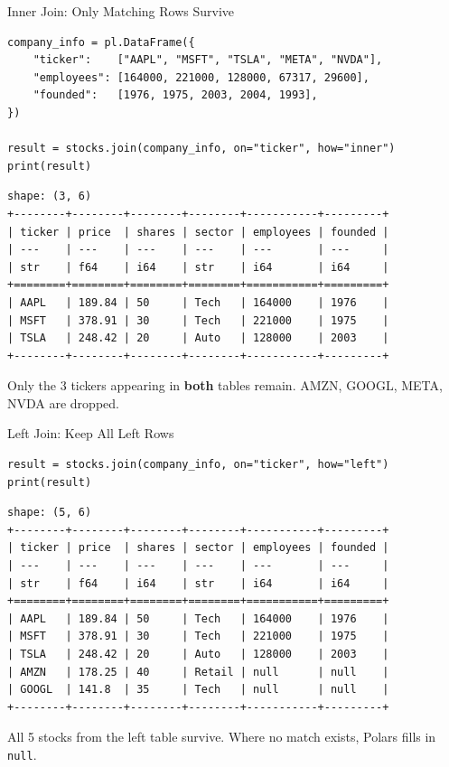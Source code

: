 \documentclass[9pt,aspectratio=169]{beamer}
\newcommand{\py}[1]{\lstinline[language=Python]{#1}}
\begin{document}
\begin{frame}[fragile]{Inner Join: Only Matching Rows Survive}

\begin{lstlisting}
company_info = pl.DataFrame({
    "ticker":    ["AAPL", "MSFT", "TSLA", "META", "NVDA"],
    "employees": [164000, 221000, 128000, 67317, 29600],
    "founded":   [1976, 1975, 2003, 2004, 1993],
})

result = stocks.join(company_info, on="ticker", how="inner")
print(result)
\end{lstlisting}

\begin{lstlisting}[style=output]
shape: (3, 6)
+--------+--------+--------+--------+-----------+---------+
| ticker | price  | shares | sector | employees | founded |
| ---    | ---    | ---    | ---    | ---       | ---     |
| str    | f64    | i64    | str    | i64       | i64     |
+========+========+========+========+===========+=========+
| AAPL   | 189.84 | 50     | Tech   | 164000    | 1976    |
| MSFT   | 378.91 | 30     | Tech   | 221000    | 1975    |
| TSLA   | 248.42 | 20     | Auto   | 128000    | 2003    |
+--------+--------+--------+--------+-----------+---------+
\end{lstlisting}

Only the 3 tickers appearing in \textbf{both} tables remain. AMZN, GOOGL, META, NVDA are dropped.

\end{frame}


\begin{frame}[fragile]{Left Join: Keep All Left Rows}

\begin{lstlisting}
result = stocks.join(company_info, on="ticker", how="left")
print(result)
\end{lstlisting}

\begin{lstlisting}[style=output]
shape: (5, 6)
+--------+--------+--------+--------+-----------+---------+
| ticker | price  | shares | sector | employees | founded |
| ---    | ---    | ---    | ---    | ---       | ---     |
| str    | f64    | i64    | str    | i64       | i64     |
+========+========+========+========+===========+=========+
| AAPL   | 189.84 | 50     | Tech   | 164000    | 1976    |
| MSFT   | 378.91 | 30     | Tech   | 221000    | 1975    |
| TSLA   | 248.42 | 20     | Auto   | 128000    | 2003    |
| AMZN   | 178.25 | 40     | Retail | null      | null    |
| GOOGL  | 141.8  | 35     | Tech   | null      | null    |
+--------+--------+--------+--------+-----------+---------+
\end{lstlisting}

All 5 stocks from the left table survive. Where no match exists, Polars fills in \py{null}.

\end{frame}
\end{document}
